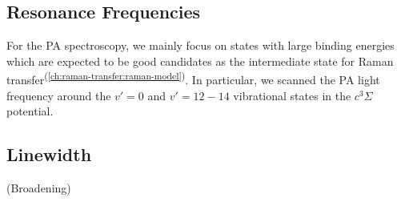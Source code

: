 \subsection{Resonance Frequencies}

For the PA spectroscopy, we mainly focus on states with large binding energies
which are expected to be good candidates as the intermediate state
for Raman transfer\textsuperscript{(\ref{ch:raman-transfer:raman-model})}.
In particular, we scanned the PA light frequency around the $v'=0$ and $v'=12-14$
vibrational states in the $c^3\Sigma$ potential.


\subsection{Linewidth}

(Broadening)
